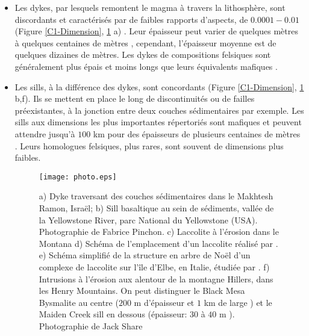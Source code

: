 \begin{itemize}
\item Les dykes, par lesquels remontent le magma à travers la
 lithosphère, sont discordants et caractérisés par de faibles rapports
 d'aspects, de $0.0001-0.01$ (Figure \ref{C1-Dimension},
 \ref{C1-picture} a)
 \citep{Rubin:1995upa,Schultz:2008ih,Kavanagh:2011kf}. Leur
 épaisseur peut varier de quelques mètres à quelques centaines de
 mètres \citep{Walker:1989jq,Krumbholz:2014dj}, cependant,
 l'épaisseur moyenne est de quelques dizaines de mètres. Les dykes de
 compositions felsiques sont généralement plus épais et moins longs
 que leurs équivalents mafiques \citep{Rubin:1995upa}.

\item Les sills, à la différence des dykes, sont concordants (Figure
 \ref{C1-Dimension}, \ref{C1-picture} b,f). Ils se mettent en place
 le long de discontinuités ou de failles préexistantes, à la jonction
 entre deux couches sédimentaires par exemple. Les sills aux
 dimensions les plus importantes répertoriés sont mafiques et peuvent
 attendre jusqu'à $100$ km pour des épaisseurs de plusieurs centaines
 de mètres \citep{Cruden:tg}. Leurs homologues felsiques, plus
 rares, sont souvent de dimensions plus faibles.

 \begin{figure}[htpb]
 \begin{center}
 \graphicspath{ {/Users/thorey/Documents/These/Manuscript/Figure/Chapter1/} }
 \texttt{[image: photo.eps]}
 \caption{a) Dyke traversant des couches sédimentaires dans le
 Makhtesh Ramon, Israël; b) Sill basaltique au sein de
 sédiments, vallée de la Yellowstone River, parc National du
 Yellowstone (USA). Photographie de Fabrice Pinchon. c)
 Laccolite à l'érosion dans le Montana d) Schéma de
 l'emplacement d'un laccolite réalisé par
 \citet{Gilbert:1877uk}. e) Schéma simplifié de la structure en
 arbre de Noël d'un complexe de laccolite sur l'île d'Elbe, en
 Italie, étudiée par \citet{Rocchi:2010dn}. f) Intrusions à
 l'érosion aux alentour de la montagne Hillers, dans les Henry
 Mountains. On peut distinguer le Black Mesa Bysmalite au
 centre ($200$ m d'épaisseur et $1$ km de large
 \citep{Morgan:2008hj}) et le Maiden Creek sill en dessous
 (épaisseur: $30$ à $40$ m \citep{Horsman:2005ct}).
 Photographie de Jack Share}
 \label{C1-picture}
 \end{center}
 \end{figure}


\end{itemize}
